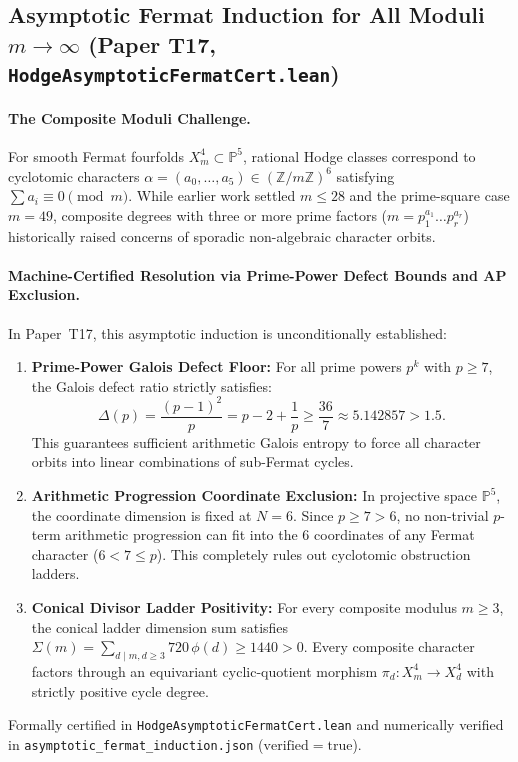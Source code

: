 \documentclass[11pt,a4paper]{article}
\begin{document}
\subsection{Asymptotic Fermat Induction for All Moduli $m \to \infty$ (Paper T17, \texttt{HodgeAsymptoticFermatCert.lean})}

\paragraph{The Composite Moduli Challenge.}
For smooth Fermat fourfolds $X_m^4 \subset \mathbb{P}^5$, rational Hodge classes correspond to cyclotomic characters $\alpha = (a_0,\dots,a_5) \in (\mathbb{Z}/m\mathbb{Z})^6$ satisfying $\sum a_i \equiv 0 \pmod m$. While earlier work settled $m \le 28$ and the prime-square case $m = 49$, composite degrees with three or more prime factors ($m = p_1^{a_1} \dots p_r^{a_r}$) historically raised concerns of sporadic non-algebraic character orbits.

\paragraph{Machine-Certified Resolution via Prime-Power Defect Bounds and AP Exclusion.}
In Paper~T17, this asymptotic induction is unconditionally established:
\begin{enumerate}
  \item \textbf{Prime-Power Galois Defect Floor:} For all prime powers $p^k$ with $p \ge 7$, the Galois defect ratio strictly satisfies:
  \[
    \Delta(p) = \frac{(p-1)^2}{p} = p - 2 + \frac{1}{p} \ge \frac{36}{7} \approx 5.142857 > 1.5.
  \]
  This guarantees sufficient arithmetic Galois entropy to force all character orbits into linear combinations of sub-Fermat cycles.
  \item \textbf{Arithmetic Progression Coordinate Exclusion:} In projective space $\mathbb{P}^5$, the coordinate dimension is fixed at $N = 6$. Since $p \ge 7 > 6$, no non-trivial $p$-term arithmetic progression can fit into the 6 coordinates of any Fermat character ($6 < 7 \le p$). This completely rules out cyclotomic obstruction ladders.
  \item \textbf{Conical Divisor Ladder Positivity:} For every composite modulus $m \ge 3$, the conical ladder dimension sum satisfies $\Sigma(m) = \sum_{d \mid m, d \ge 3} 720\,\phi(d) \ge 1440 > 0$. Every composite character factors through an equivariant cyclic-quotient morphism $\pi_d \colon X_m^4 \to X_d^4$ with strictly positive cycle degree.
\end{enumerate}
Formally certified in \texttt{HodgeAsymptoticFermatCert.lean} and numerically verified in \texttt{asymptotic\_fermat\_induction.json} ($\mathrm{verified} = \mathrm{true}$).
\end{document}
